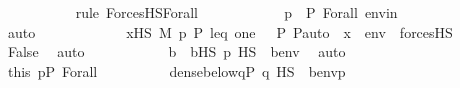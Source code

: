 \begin{isabellebody}
\ \ \ \ \ \ \ \ \ \ \isamarkupfalse%
{\isacharparenleft}{\kern0pt}rule\ ForcesHS{\isacharunderscore}{\kern0pt}Forall{\isacharparenright}{\kern0pt}\isanewline
\ \ \ \ \ \ \ \ \ \ \isamarkupfalse%
\ {\isacartoucheopen}p\ {\isasymin}\ P{\isacartoucheclose}\ Forall\ envin\isanewline
\ \ \ \ \ \ \ \ \ \ \isamarkupfalse%
\ auto\isanewline
\ \ \ \ \ \ \ \ \isamarkupfalse%
\ \isamarkupfalse%
\ {\isachardoublequoteopen}{\isasymnot}\ {\isacharparenleft}{\kern0pt}{\isasymforall}x{\isasymin}HS{\isachardot}{\kern0pt}\ M{\isacharcomma}{\kern0pt}\ {\isacharbrackleft}{\kern0pt}p{\isacharcomma}{\kern0pt}\ P{\isacharcomma}{\kern0pt}\ leq{\isacharcomma}{\kern0pt}\ one{\isacharcomma}{\kern0pt}\ {\isasymlangle}{\isasymF}{\isacharcomma}{\kern0pt}\ {\isasymG}{\isacharcomma}{\kern0pt}\ P{\isacharcomma}{\kern0pt}\ P{\isacharunderscore}{\kern0pt}auto{\isasymrangle}{\isacharbrackright}{\kern0pt}\ {\isacharat}{\kern0pt}\ {\isacharbrackleft}{\kern0pt}x{\isacharbrackright}{\kern0pt}\ {\isacharat}{\kern0pt}\ env\ {\isasymTurnstile}\ forcesHS{\isacharparenleft}{\kern0pt}{\isasymphi}{\isacharparenright}{\kern0pt}{\isacharparenright}{\kern0pt}{\isachardoublequoteclose}\ \isamarkupfalse%
\ False\ \isamarkupfalse%
\ auto\isanewline
\ \ \ \ \ \ \ \ \isamarkupfalse%
\ \isamarkupfalse%
\ b\ \ {\isachardoublequoteopen}b{\isasymin}HS{\isachardoublequoteclose}\ {\isachardoublequoteopen}{\isasymnot}{\isacharparenleft}{\kern0pt}p\ {\isasymtturnstile}HS\ {\isasymphi}\ {\isacharparenleft}{\kern0pt}{\isacharbrackleft}{\kern0pt}b{\isacharbrackright}{\kern0pt}{\isacharat}{\kern0pt}env{\isacharparenright}{\kern0pt}{\isacharparenright}{\kern0pt}{\isachardoublequoteclose}\ \isamarkupfalse%
\ auto\isanewline
\ \ \ \ \ \ \ \ \isamarkupfalse%
\ \isamarkupfalse%
\ this\ {\isacartoucheopen}p{\isasymin}P{\isacartoucheclose}\ Forall\isanewline
\ \ \ \ \ \ \ \ \isamarkupfalse%
\ {\isachardoublequoteopen}{\isasymnot}dense{\isacharunderscore}{\kern0pt}below{\isacharparenleft}{\kern0pt}{\isacharbraceleft}{\kern0pt}q{\isasymin}P{\isachardot}{\kern0pt}\ q\ {\isasymtturnstile}HS\ {\isasymphi}\ {\isacharparenleft}{\kern0pt}{\isacharbrackleft}{\kern0pt}b{\isacharbrackright}{\kern0pt}{\isacharat}{\kern0pt}env{\isacharparenright}{\kern0pt}{\isacharbraceright}{\kern0pt}{\isacharcomma}{\kern0pt}p{\isacharparenright}{\kern0pt}{\isachardoublequoteclose}\isanewline
\ \ \ \ \ \ \ \ \ \ \isamarkupfalse%

\end{isabellebody}
